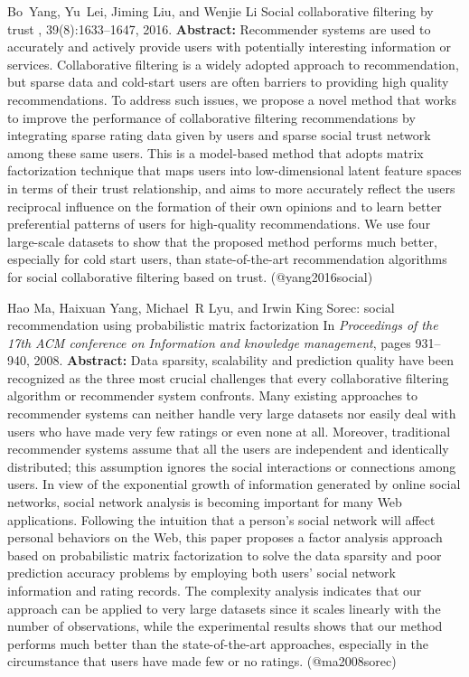 \documentclass{article}
\begin{document}
\begin{thebibliography}{}
 Bo~Yang, Yu~Lei, Jiming Liu, and Wenjie Li \newblock Social collaborative filtering by trust , 39(8):1633--1647, 2016. \newblock \textbf{Abstract:} Recommender systems are used to accurately and actively provide users with potentially interesting information or services. Collaborative filtering is a widely adopted approach to recommendation, but sparse data and cold-start users are often barriers to providing high quality recommendations. To address such issues, we propose a novel method that works to improve the performance of collaborative filtering recommendations by integrating sparse rating data given by users and sparse social trust network among these same users. This is a model-based method that adopts matrix factorization technique that maps users into low-dimensional latent feature spaces in terms of their trust relationship, and aims to more accurately reflect the users reciprocal influence on the formation of their own opinions and to learn better preferential patterns of users for high-quality recommendations. We use four large-scale datasets to show that the proposed method performs much better, especially for cold start users, than state-of-the-art recommendation algorithms for social collaborative filtering based on trust. \newblock (@yang2016social)

 Hao Ma, Haixuan Yang, Michael~R Lyu, and Irwin King \newblock Sorec: social recommendation using probabilistic matrix factorization \newblock In {\em Proceedings of the 17th ACM conference on Information and knowledge management}, pages 931--940, 2008. \newblock \textbf{Abstract:} Data sparsity, scalability and prediction quality have been recognized as the three most crucial challenges that every collaborative filtering algorithm or recommender system confronts. Many existing approaches to recommender systems can neither handle very large datasets nor easily deal with users who have made very few ratings or even none at all. Moreover, traditional recommender systems assume that all the users are independent and identically distributed; this assumption ignores the social interactions or connections among users. In view of the exponential growth of information generated by online social networks, social network analysis is becoming important for many Web applications. Following the intuition that a person's social network will affect personal behaviors on the Web, this paper proposes a factor analysis approach based on probabilistic matrix factorization to solve the data sparsity and poor prediction accuracy problems by employing both users' social network information and rating records. The complexity analysis indicates that our approach can be applied to very large datasets since it scales linearly with the number of observations, while the experimental results shows that our method performs much better than the state-of-the-art approaches, especially in the circumstance that users have made few or no ratings. \newblock (@ma2008sorec)


\end{thebibliography}
\end{document}
